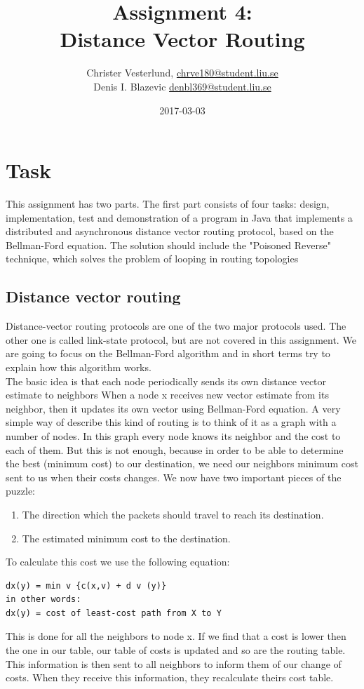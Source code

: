 \documentclass{mall}
\author{Christer Vesterlund, \url{chrve180@student.liu.se}\\
  Denis I. Blazevic \url{denbl369@student.liu.se}}
\title{Assignment 4:\\Distance Vector Routing}
\date{2017-03-03}
\begin{document}
\projectpage
\tableofcontents
\newpage 

\section{Task} 
This assignment has two parts. The first part consists of four tasks: design, implementation, test and demonstration of a program in Java that implements a distributed and asynchronous distance vector routing protocol, based on the Bellman-Ford equation. The solution should include the "Poisoned Reverse" technique, which solves the problem of looping in routing topologies
\subsection{Distance vector routing}
Distance-vector routing protocols are one of the two major protocols used. The other one is called link-state protocol, but are not covered in this assignment. We are going to focus on the Bellman-Ford algorithm and in short terms try to explain how this algorithm works.\\

\setlength{\parindent}{0mm}
The basic idea is that each node periodically sends its own distance vector estimate to neighbors When a node x receives new vector estimate from its neighbor, then it updates its own vector using Bellman-Ford equation. A very simple way of describe this kind of routing is to think of it as a graph with a number of nodes. In this graph every node knows its neighbor and the cost to each of them. But this is not enough, because in order to be able to determine the best (minimum cost) to our destination, we need our neighbors minimum cost sent to us when their costs changes. We now have two important pieces of the puzzle:
\begin{enumerate}
\item The direction which the packets should travel to reach its destination.
\item The estimated minimum cost to the destination.
\end{enumerate}
To calculate this cost we use the following equation:
\begin{verbatim}
dx(y) = min v {c(x,v) + d v (y)}
in other words:
dx(y) = cost of least-cost path from X to Y
\end{verbatim}
This is done for all the neighbors to node x. If we find that a cost is lower then the one in our table, our table of costs is updated and so are the routing table. This information is then sent to all neighbors to inform them of our change of costs. When they receive this information, they recalculate theirs cost table.
\end{document}
